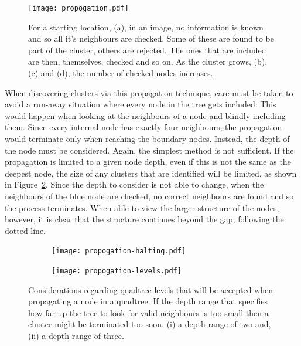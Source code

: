 \begin{figure}[tbhp]
	\centering
	\texttt{[image: propogation.pdf]}

	\caption[Propagation of a cluster from a starting location.]{For a starting
		location, (a), in an image, no information is known and so all it's
		neighbours are checked. Some of these are found to be part of the
		cluster, others are rejected. The ones that are included are then,
		themselves, checked and so on. As the cluster grows, (b), (c) and
		(d), the number of checked nodes increases.}\label{fig:propogation}
\end{figure}

When discovering clusters via this propagation technique, care must be taken to
avoid a run-away situation where every node in the tree gets included. This
would happen when looking at the neighbours of a node and blindly including
them. Since every internal node has exactly four neighbours, the propagation
would terminate only when reaching the boundary nodes. Instead, the depth of
the node must be considered. Again, the simplest method is not sufficient. If
the propagation is limited to a given node depth, even if this is not the same
as the deepest node, the size of any clusters that are identified will be
limited, as shown in Figure~\ref{fig:propogation-halting}.  Since the depth to
consider is not able to change, when the neighbours of the blue node are
checked, no correct neighbours are found and so the process terminates. When
able to view the larger structure of the nodes, however, it is clear that the
structure continues beyond the gap, following the dotted line.

\begin{figure}[tbhp]
	\centering
	\begin{subfigure}[c]{5.2cm}
		\texttt{[image: propogation-halting.pdf]}
		\caption{}\label{fig:propogation-halting}
	\end{subfigure}%
	\quad
	\begin{subfigure}[c]{3.2cm}
		\texttt{[image: propogation-levels.pdf]}
		\caption{}\label{fig:propogation-levels}
	\end{subfigure}

	\caption[Considerations regarding quadtree levels to be
	accepted.]{Considerations regarding quadtree levels that will be accepted
		when propagating a node in a quadtree. 
		If the depth range that specifies how far up the tree to look for valid
		neighbours is too small then a cluster might be terminated too soon.
		(i) a depth range of two and, (ii) a
		depth range of three.}\label{fig:prop-levels-halting}
\end{figure}


